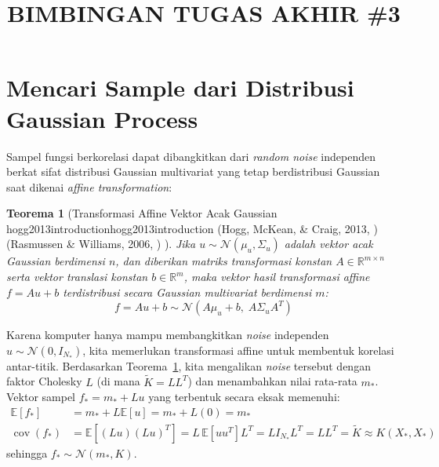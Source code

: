 \documentclass[11pt,a4paper]{article}
\title{
    \vspace{-1.2cm}
    \textbf{\Large BIMBINGAN TUGAS AKHIR \#3} \\[0.2em]
}
\def\mathbf#1{#1}%
\newcommand{\citep}[2][]{%
  \def\key{#2}%
  \def\hoggkey{hogg2013introduction}%
  \ifx\key\hoggkey
    (Hogg, McKean, \& Craig, 2013\if\relax\detokenize{#1}\relax\else, #1\fi)%
  \else
    (Rasmussen \& Williams, 2006\if\relax\detokenize{#1}\relax\else, #1\fi)%
  \fi
}
\newtheorem{teorema}{Teorema}[section]
\begin{document}
\maketitle
\vspace{-0.6cm}

\section{Mencari Sample dari Distribusi Gaussian Process}
\label{sec:mekanisme_sampling}

Sampel fungsi berkorelasi dapat dibangkitkan dari \textit{random noise} independen berkat sifat distribusi Gaussian multivariat yang tetap berdistribusi Gaussian saat dikenai \textit{affine transformation}:

\begin{teorema}[Transformasi Affine Vektor Acak Gaussian \citep{hogg2013introduction}]
\label{thm:affine_trans}
Jika $\mathbf{u} \sim \mathcal{N}(\mathbf{\mu}_u, \Sigma_u)$ adalah vektor acak Gaussian berdimensi $n$, dan diberikan matriks transformasi konstan $A \in \mathbb{R}^{m \times n}$ serta vektor translasi konstan $\mathbf{b} \in \mathbb{R}^m$, maka vektor hasil transformasi affine $\mathbf{f} = A \mathbf{u} + \mathbf{b}$ terdistribusi secara Gaussian multivariat berdimensi $m$:
\begin{equation}
\mathbf{f} = A \mathbf{u} + \mathbf{b} \sim \mathcal{N}\left(A \mathbf{\mu}_u + \mathbf{b}, \; A \Sigma_u A^T\right)
\end{equation}
\end{teorema}

Karena komputer hanya mampu membangkitkan \textit{noise} independen $\mathbf{u} \sim \mathcal{N}(\mathbf{0}, I_{N_*})$, kita memerlukan transformasi affine untuk membentuk korelasi antar-titik. Berdasarkan Teorema~\ref{thm:affine_trans}, kita mengalikan \textit{noise} tersebut dengan faktor Cholesky $L$ (di mana $\tilde{K} = L L^T$) dan menambahkan nilai rata-rata $\mathbf{m}_*$. Vektor sampel $\mathbf{f}_* = \mathbf{m}_* + L\mathbf{u}$ yang terbentuk secara eksak memenuhi:
\begin{align}
\mathbb{E}[\mathbf{f}_*] &= \mathbf{m}_* + L \mathbb{E}[\mathbf{u}] = \mathbf{m}_* + L(\mathbf{0}) = \mathbf{m}_* \\
\operatorname{cov}(\mathbf{f}_*) &= \mathbb{E}\left[(L\mathbf{u})(L\mathbf{u})^T\right] = L \, \mathbb{E}[\mathbf{u}\mathbf{u}^T] L^T = L I_{N_*} L^T = L L^T = \tilde{K} \approx K(X_*, X_*)
\end{align}
sehingga $\mathbf{f}_* \sim \mathcal{N}(\mathbf{m}_*, K)$.
\end{document}
